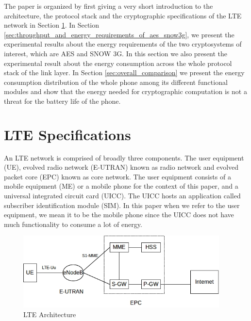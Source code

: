 \documentclass[lnicst,sechang,a4paper]{svmultln}
\begin{document}
The paper is organized by first giving a very short introduction to the architecture, the protocol stack and the cryptographic specifications of the LTE network in Section \ref{sec:lte_specifications}. In Section \ref{sec:throughput_and_energy_requirements_of_aes_snow3g}, we present the experimental results about the energy requirements of the two cryptosystems of interest, which are AES and SNOW 3G. In this section we also present the experimental result about the energy consumption across the whole protocol stack of the link layer. In Section \ref{sec:overall_comparison} we present the energy consumption distribution of the whole phone among its different functional modules and show that the energy needed for cryptographic computation is not a threat for the battery life of the phone. 

\section{LTE Specifications}
\label{sec:lte_specifications}
An LTE network is comprised of broadly three components. The user equipment (UE), evolved radio network (E-UTRAN) known as radio network and evolved packet core (EPC) known as core network. The user equipment consists of a mobile equipment (ME) or a mobile phone for the context of this paper, and a universal integrated circuit card (UICC). The UICC hosts an application called subscriber identification module (SIM). In this paper when we refer to the user equipment, we mean it to be the mobile phone since the UICC does not have much functionality to consume a lot of energy.

\begin{figure}
  \includegraphics[width=0.95\textwidth]{lte_architecture.jpg}
\caption{LTE Architecture}
\label{fig:protocl_stack}       %
\end{figure}
\end{document}
